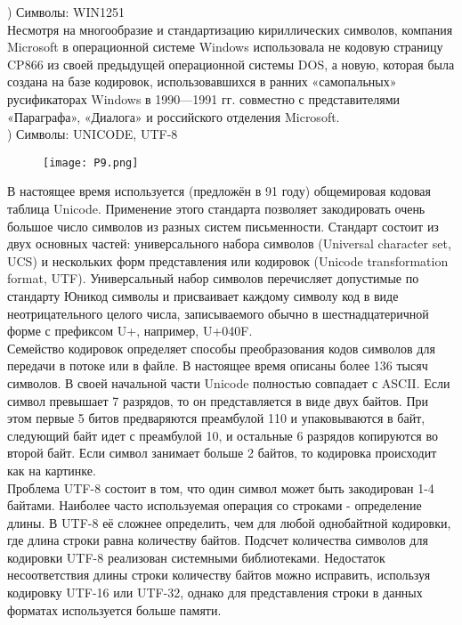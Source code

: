 ) Символы: WIN1251 \\
Несмотря на многообразие и стандартизацию кириллических символов, компания Microsoft в операционной системе Windows использовала не кодовую страницу CP866 из своей предыдущей операционной системы DOS, а новую, которая была создана на базе кодировок, использовавшихся в ранних «самопальных» русификаторах Windows в 1990—1991 гг. совместно с представителями «Параграфа», «Диалога» и российского отделения Microsoft. \\

) Символы: UNICODE, UTF-8 \\
\begin{figure}[H]
    \centering
    \texttt{[image: P9.png]}
\end{figure}
\noindent В настоящее время используется (предложён в 91 году) общемировая кодовая таблица Unicode. Применение этого стандарта позволяет закодировать очень большое число символов из разных систем письменности. Стандарт состоит из двух основных частей: универсального набора символов (Universal character set, UCS) и нескольких форм представления или кодировок (Unicode transformation format, UTF). Универсальный набор символов перечисляет допустимые по стандарту Юникод символы и присваивает каждому символу код в виде неотрицательного целого числа, записываемого обычно в шестнадцатеричной форме с префиксом U+, например, U+040F. \\
Семейство кодировок определяет способы преобразования кодов символов для передачи в потоке или в файле. В настоящее время описаны более 136 тысяч символов. В своей начальной части Unicode полностью совпадает с ASCII. Если символ превышает 7 разрядов, то он представляется в виде двух байтов. При этом первые 5 битов предваряются преамбулой 110 и упаковываются в байт, следующий байт идет с преамбулой 10, и остальные 6 разрядов копируются во второй байт. Если символ занимает больше 2 байтов, то кодировка происходит как на картинке.  \\
Проблема UTF-8 состоит в том, что один символ может быть закодирован 1-4 байтами. Наиболее часто используемая операция со строками - определение длины. В UTF-8 её сложнее определить, чем для любой однобайтной кодировки, где длина строки равна количеству байтов. Подсчет количества символов для кодировки UTF-8 реализован системными библиотеками.
Недостаток несоответствия длины строки количеству байтов можно исправить, используя кодировку UTF-16 или UTF-32, однако для представления строки в данных форматах используется больше памяти. \\

